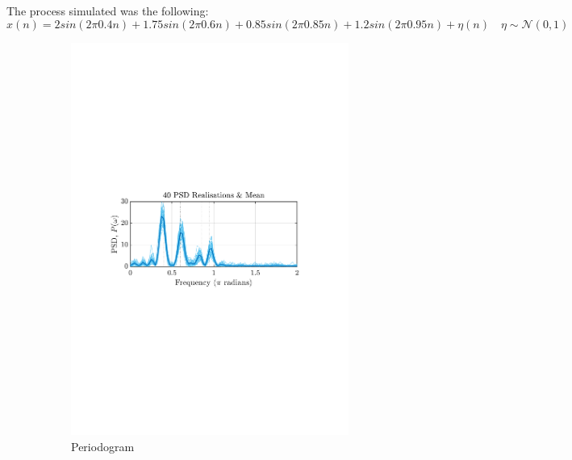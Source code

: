 \documentclass[12pt]{article}
\begin{document}
	The process simulated was the following:
	\begin{equation}
	x(n) = 2 sin(2 \pi 0.4 n) + 1.75 sin(2 \pi 0.6 n) + 0.85 sin(2 \pi 0.85 n) + 1.2 sin(2 \pi 0.95 n) + \eta(n) \quad \eta \sim \mathcal{N}(0, 1)
	\end{equation}

	\begin{figure}[H]
		\centering
		\begin{subfigure}{0.49\textwidth}
			\centering
			\includegraphics[trim={2.2cm 11.2cm 3.15cm  11.2cm}, clip, width=\textwidth]{../MATLAB/figures/q1_3b_fig01.pdf} 
			\captionsetup{justification=centering}
			\caption{Periodogram}
		\end{subfigure}
		\begin{subfigure}{0.49\textwidth}
			\centering

\end{subfigure}
\end{figure}
\end{document}
